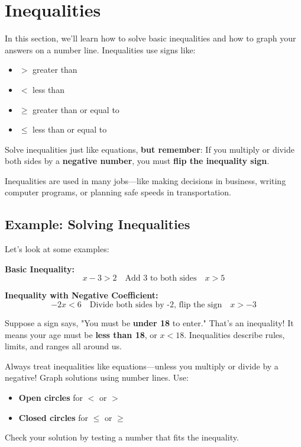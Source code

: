 \cleardoublepage
\section{Inequalities}

In this section, we'll learn how to solve basic inequalities and how to graph your answers on a number line. Inequalities use signs like:
\begin{itemize}
  \item $>$ greater than
  \item $<$ less than
  \item $\geq$ greater than or equal to
  \item $\leq$ less than or equal to
\end{itemize}

Solve inequalities just like equations, \textbf{but remember}: If you multiply or divide both sides by a \textbf{negative number}, you must \textbf{flip the inequality sign}.

Inequalities are used in many jobs—like making decisions in business, writing computer programs, or planning safe speeds in transportation.

\subsection*{Example: Solving Inequalities}

Let's look at some examples:

\textbf{Basic Inequality:}
\[
x - 3 > 2 \quad \text{Add 3 to both sides} \quad x > 5
\]

\textbf{Inequality with Negative Coefficient:}
\[
-2x < 6 \quad \text{Divide both sides by -2, flip the sign} \quad x > -3
\]

Suppose a sign says, "You must be \textbf{under 18} to enter." That's an inequality! It means your age must be \textbf{less than 18}, or $x < 18$. Inequalities describe rules, limits, and ranges all around us.

Always treat inequalities like equations—unless you multiply or divide by a negative! Graph solutions using number lines. Use:
\begin{itemize}
  \item \textbf{Open circles} for $<$ or $>$
  \item \textbf{Closed circles} for $\leq$ or $\geq$
\end{itemize}

Check your solution by testing a number that fits the inequality.




